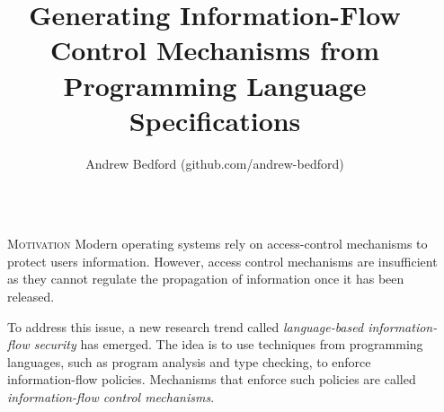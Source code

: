 \documentclass[final]{beamer}
\title{Generating Information-Flow Control Mechanisms from\\ Programming Language Specifications} %
\author{Andrew Bedford (github.com/andrew-bedford)} %
\institute{Laval University, Canada} %
\newlength{\sepwid}
\newlength{\onecolwid}
\begin{document}

\setlength{\belowcaptionskip}{2ex} %
\setlength\belowdisplayshortskip{2ex} %

\begin{frame}[fragile] %

\begin{columns}[t] %

\begin{column}{\sepwid}\end{column} %

\begin{column}{\onecolwid} %



\begin{block}{\textsc{Motivation}}
    Modern operating systems rely on access-control mechanisms to protect users information. However, access control mechanisms are insufficient as they cannot regulate the propagation of information once it has been released. 
    
    To address this issue, a new research trend called \emph{language-based information-flow security} has emerged. The idea is to use techniques from programming languages, such as program analysis and type checking, to enforce information-flow policies. Mechanisms that enforce such policies are called \emph{information-flow control mechanisms}. 
\end{block}


\end{column}
\end{columns}
\end{frame}
\end{document}
